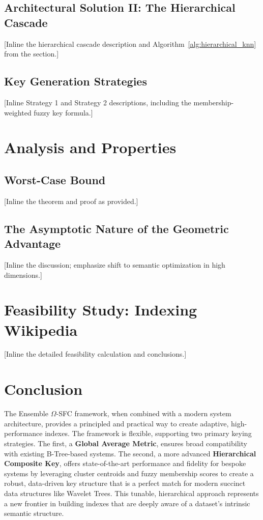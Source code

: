\documentclass[sigconf]{acmart}
\begin{document}
\subsection{Architectural Solution II: The Hierarchical Cascade}
[Inline the hierarchical cascade description and Algorithm~\ref{alg:hierarchical_knn} from the section.]

\subsection{Key Generation Strategies}
[Inline Strategy 1 and Strategy 2 descriptions, including the membership-weighted fuzzy key formula.]

\section{Analysis and Properties}
\subsection{Worst-Case Bound}
[Inline the theorem and proof as provided.]

\subsection{The Asymptotic Nature of the Geometric Advantage}
[Inline the discussion; emphasize shift to semantic optimization in high dimensions.]

\section{Feasibility Study: Indexing Wikipedia}
[Inline the detailed feasibility calculation and conclusions.]

\section{Conclusion}
The Ensemble $\Omega$-SFC framework, when combined with a modern system architecture, provides a principled and practical way to create adaptive, high-performance indexes. The framework is flexible, supporting two primary keying strategies. The first, a \textbf{Global Average Metric}, ensures broad compatibility with existing B-Tree-based systems. The second, a more advanced \textbf{Hierarchical Composite Key}, offers state-of-the-art performance and fidelity for bespoke systems by leveraging cluster centroids and fuzzy membership scores to create a robust, data-driven key structure that is a perfect match for modern succinct data structures like Wavelet Trees. This tunable, hierarchical approach represents a new frontier in building indexes that are deeply aware of a dataset's intrinsic semantic structure.



\end{document}

